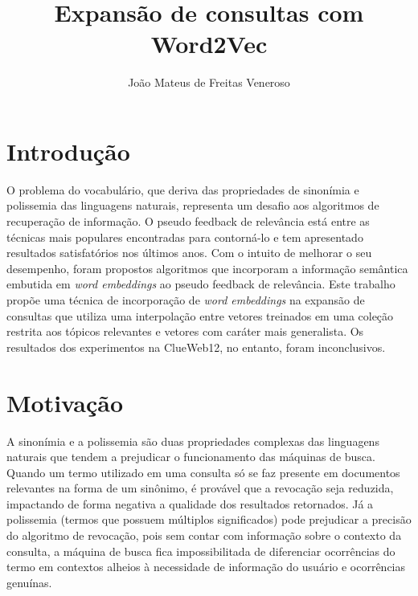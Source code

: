\documentclass{article}
\begin{document}
\title{Expansão de consultas com Word2Vec}
\author{João Mateus de Freitas Veneroso}

\maketitle

\section{Introdução}

O problema do vocabulário, que deriva das propriedades de sinonímia e polissemia das linguagens
naturais, representa um desafio aos algoritmos de recuperação de informação. O pseudo feedback de
relevância está entre as técnicas mais populares encontradas para contorná-lo e tem apresentado
resultados satisfatórios nos últimos anos. Com o intuito de melhorar o seu desempenho, foram propostos
algoritmos que incorporam a informação semântica embutida em \textit{word embeddings} ao pseudo feedback de 
relevância. Este trabalho propõe uma técnica de incorporação de \textit{word embeddings} na expansão de consultas
que utiliza uma interpolação entre vetores treinados em uma coleção restrita aos tópicos relevantes e vetores
com caráter mais generalista. Os resultados dos experimentos na ClueWeb12, no entanto, foram inconclusivos.

\section{Motivação}

A sinonímia e a polissemia são duas propriedades complexas das linguagens naturais que tendem a prejudicar o
funcionamento das máquinas de busca. Quando um termo utilizado em uma consulta só se faz presente em documentos relevantes 
na forma de um sinônimo, é provável que a revocação seja reduzida, impactando de forma negativa a
qualidade dos resultados retornados. Já a polissemia (termos que possuem múltiplos significados) pode prejudicar 
a precisão do algoritmo de revocação, pois sem contar com informação sobre o contexto da consulta, a máquina de busca
fica impossibilitada de diferenciar ocorrências do termo em contextos alheios à necessidade de informação do usuário e
ocorrências genuínas.
\end{document}

